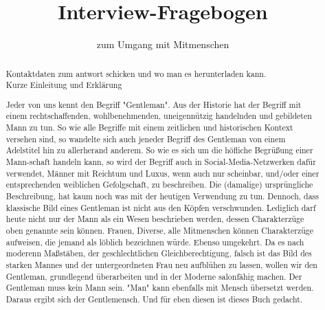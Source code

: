 \documentclass[a4paper,12pt]{scrartcl}
\begin{document}
\title{Interview-Fragebogen}
\author{zum Umgang mit Mitmenschen}
\date{}
\maketitle

\begin{abstract}
    {\color{red} Kontaktdaten zum antwort schicken und wo man es herunterladen kann.\\ Kurze Einleitung und Erklärung}


    Jeder von uns kennt den Begriff "Gentleman". Aus der Historie hat der Begriff mit einem rechtschaffenden, wohlbenehmenden, 
    uneigennützig handelnden und gebildeten Mann zu tun. So wie alle Begriffe mit einem zeitlichen und historischen Kontext
    versehen sind, so wandelte sich auch jeneder Begriff des Gentleman von einem Adelstitel hin zu allerherand anderem.
    So wie es sich um die höfliche Begrüßung einer Mann-schaft handeln kann, so wird der Begriff auch in Social-Media-Netzwerken
    dafür verwendet, Männer mit Reichtum und Luxus, wenn auch nur scheinbar, und/oder einer entsprechenden weiblichen Gefolgschaft,
    zu beschreiben. Die (damalige) ursprüngliche Beschreibung, hat kaum noch was mit der heutigen Verwendung zu tun.
    Dennoch, dass klassische Bild eines Gentleman ist nicht aus den Köpfen verschwunden. Lediglich darf heute nicht nur der
    Mann als ein Wesen beschrieben werden, dessen Charakterzüge oben genannte sein können. Frauen, Diverse, alle Mitmenschen
    können Charakterzüge aufweisen, die jemand als löblich bezeichnen würde. Ebenso umgekehrt.
    Da es nach moderenn Maßstäben, der geschlechtlichen Gleichberechtigung, falsch ist das Bild des starken Mannes und der 
    untergeordneten Frau neu aufblühen zu lassen, wollen wir den Gentleman, grundlegend überarbeiten 
    und in der Moderne salonfähig machen. Der Gentleman muss kein Mann sein. "Man" kann ebenfalls mit Mensch übersetzt werden.
    Daraus ergibt sich der Gentlemensch. Und für eben diesen ist dieses Buch gedacht.
    \\ 
    \\ 
    

\end{abstract}
\end{document}
